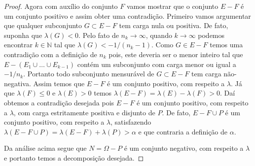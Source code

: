 \begin{proof}
Agora com auxílio do conjunto $F$ vamos mostrar que o 
conjunto $E-F$ é um conjunto positivo e assim obter uma contradição.
Primeiro vamos argumentar que qualquer subconjunto 
$G\subset E-F$ tem carga nula ou positiva. 
De fato, suponha que $\lambda(G)<0$. 
Pelo fato de $n_k\to\infty$, quando $k\to\infty$ 
podemos encontrar $k\in\mathbb{N}$ tal que 
$\lambda(G)<-1/(n_k-1)$. Como $G\in E-F$ temos
uma contradição com a definição de $n_k$
pois, este deveria ser o menor inteiro tal que 
$E-(E_1\cup\ldots\cup E_{k-1})$
contém um subconjunto com carga menor ou igual 
a $-1/n_k$. Portanto todo subconjunto mensurável 
de $G\subset E-F$ tem carga não-negativa.
Assim temos que $E-F$ é um conjunto positivo,
com respeito a $\lambda$. 
Já que $\lambda(F)\leq 0$ e $\lambda(E)>0$ temos  
$\lambda(E-F)=\lambda(E)-\lambda(F)>0$.
Daí obtemos a contradição desejada pois 
$E-F$ é um conjunto positivo, com respeito a $\lambda$,
com carga estritamente positiva e disjunto de $P$. De fato,
$E-F\cup P$ é um conjunto positivo, com respeito a $\lambda$,
satisfazendo $\lambda(E-F\cup P)= \lambda(E-F)+\lambda(P)>\alpha$
e que contraria a definição de $\alpha$. 

Da análise acima segue que $N=\Omega-P$ é um 
conjunto negativo, com respeito a $\lambda$ e 
portanto temos a decomposição desejada.



 
\end{proof}